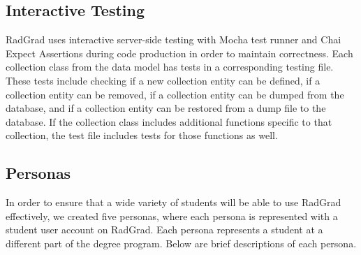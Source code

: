 \subsection{Interactive Testing}
RadGrad uses interactive server-side testing with Mocha test runner and Chai Expect Assertions during code production in order to maintain correctness. Each collection class from the data model has tests in a corresponding testing file. These tests include checking if a new collection entity can be defined, if a collection entity can be removed, if a collection entity can be dumped from the database, and if a collection entity can be restored from a dump file to the database. If the collection class includes additional functions specific to that collection, the test file includes tests for those functions as well.

\subsection{Personas}
In order to ensure that a wide variety of students will be able to use RadGrad effectively, we created five personas, where each persona is represented with a student user account on RadGrad. Each persona represents a student at a different part of the degree program. Below are brief descriptions of each persona. 

